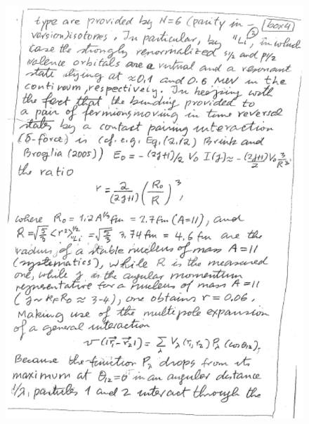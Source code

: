 \documentclass[a4paper,11pt]{book}
\numberwithin{equation}{section}
\numberwithin{figure}{section}
\numberwithin{table}{section}
\begin{document}
\begin{figure}
\centerline{\includegraphics*[width=\textwidth,angle=0]{figs/box4_10.pdf}}
\end{figure}
\end{document}
